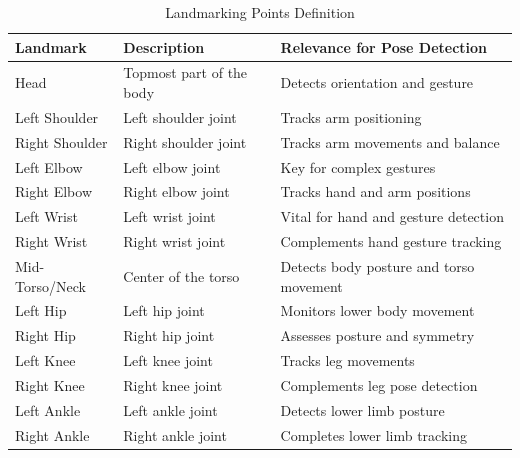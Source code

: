 \begin{table}[h]
\centering
\small
\begin{tabular}{|l|l|l|}
\hline
\textbf{Landmark} & \textbf{Description} & \textbf{Relevance for Pose Detection} \\ \hline
Head & Topmost part of the body & Detects orientation and gesture \\ \hline
Left Shoulder & Left shoulder joint & Tracks arm positioning \\ \hline
Right Shoulder & Right shoulder joint & Tracks arm movements and balance \\ \hline
Left Elbow & Left elbow joint & Key for complex gestures \\ \hline
Right Elbow & Right elbow joint & Tracks hand and arm positions \\ \hline
Left Wrist & Left wrist joint & Vital for hand and gesture detection \\ \hline
Right Wrist & Right wrist joint & Complements hand gesture tracking \\ \hline
Mid-Torso/Neck & Center of the torso & Detects body posture and torso movement \\ \hline
Left Hip & Left hip joint & Monitors lower body movement \\ \hline
Right Hip & Right hip joint & Assesses posture and symmetry \\ \hline
Left Knee & Left knee joint & Tracks leg movements \\ \hline
Right Knee & Right knee joint & Complements leg pose detection \\ \hline
Left Ankle & Left ankle joint & Detects lower limb posture \\ \hline
Right Ankle & Right ankle joint & Completes lower limb tracking \\ \hline
\end{tabular}
\caption{Landmarking Points Definition}
\label{tab:landmarking_points}
\end{table}
\restoregeometry


